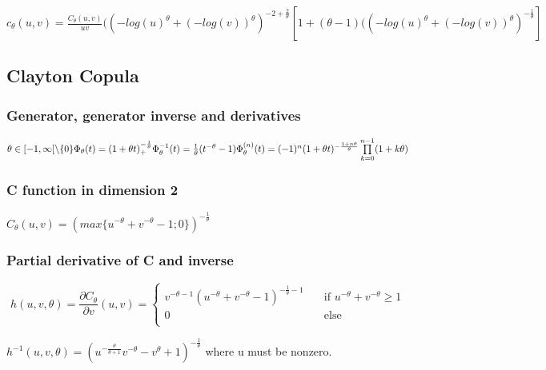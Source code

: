 \documentclass{article}
\begin{document}
	\begin{math}
		c_\theta (u,v) =  \frac{C_\theta (u,v)}{u v} ((-log(u)^{\theta}+(-log(v))^{\theta})^{-2+\frac{2}{\theta}} [1+ (\theta -1)((-log(u)^{\theta}+(-log(v))^{\theta})^{-\frac{1}{\theta}}]
	\end{math}



   	\subsection{Clayton Copula}
   	\subsubsection{Generator, generator inverse and derivatives}
   	\begin{math}
   		\theta \in  [-1,\infty[ \backslash \{ 0 \} \newline
   		\newline
   		\Phi_{\theta}(t)= (1+\theta t)_+^{-\frac{1}{\theta} }
   		\newline
   		\Phi_{\theta}^{-1}(t)=\frac{1}{\theta}(t^{-\theta}-1) \newline
   		\newline
   		\Phi_{\theta}^{(n)}(t) = (-1)^n (1+\theta t)^{-\frac{1+n \theta}{\theta}} \prod\limits_{k=0}^{n-1} (1 + k \theta)
   	\end{math}

	\subsubsection{C function in dimension 2}
   	\begin{math}
   		C_{\theta}(u,v) = (max\{u^{-\theta}+v^{-\theta}-1;0\})^{-\frac{1}{\theta}}
   	\end{math}
	\subsubsection{Partial derivative of C and inverse}
   	\[
   		h(u,v,\theta)=\frac{\partial C_{\theta}}{\partial v} (u,v) = \begin{cases}
        v^{-\theta-1}(u^{-\theta}+v^{-\theta}-1)^{-\frac{1}{\theta}-1}  & \quad \text{if } u^{-\theta}+v^{-\theta} \geq 1 \\
    0  & \quad \text{else} \\
  \end{cases}
  \]

  	\begin{math}
  	h^{-1}(u,v,\theta) = (u^{-\frac{\theta}{\theta+1}}v^{-\theta}-v^{\theta}+1)^{-\frac{1}{\theta}}
	\end{math}
	where u must be nonzero.
\end{document}
